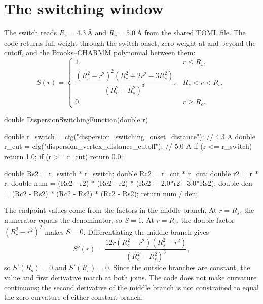 \documentclass[11pt]{article}
\begin{document}
\section{The switching window}

The switch reads
\(R_s=\SI{4.3}{\angstrom}\) and \(R_c=\SI{5.0}{\angstrom}\) from the shared
TOML file. The code returns full weight through the switch onset, zero weight
at and beyond the cutoff, and the Brooks--CHARMM polynomial between them:
\[
S(r)=
\begin{cases}
1, & r\le R_s,\\[3pt]
\dfrac{(R_c^2-r^2)^2(R_c^2+2r^2-3R_s^2)}
      {(R_c^2-R_s^2)^3}, & R_s<r<R_c,\\[9pt]
0, & r\ge R_c .
\end{cases}
\]

\begin{codebox}
double DispersionSwitchingFunction(double r) {
    double r_switch = cfg("dispersion_switching_onset_distance"); // 4.3 A
    double r_cut    = cfg("dispersion_vertex_distance_cutoff");    // 5.0 A
    if (r <= r_switch) return 1.0;
    if (r >= r_cut)    return 0.0;

    double Rs2 = r_switch * r_switch;
    double Rc2 = r_cut * r_cut;
    double r2  = r * r;
    double num = (Rc2 - r2) * (Rc2 - r2) * (Rc2 + 2.0*r2 - 3.0*Rs2);
    double den = (Rc2 - Rs2) * (Rc2 - Rs2) * (Rc2 - Rs2);
    return num / den;
}
\end{codebox}

The endpoint values come from the factors in the middle branch. At
\(r=R_s\), the numerator equals the denominator, so \(S=1\). At \(r=R_c\), the
double factor \((R_c^2-r^2)^2\) makes \(S=0\). Differentiating the middle
branch gives
\[
  S'(r)=
  \frac{12r(R_c^2-r^2)(R_s^2-r^2)}{(R_c^2-R_s^2)^3},
\]
so \(S'(R_s)=0\) and \(S'(R_c)=0\). Since the outside branches are constant,
the value and first derivative match at both joins. The code does not make
curvature continuous; the second derivative of the middle branch is not
constrained to equal the zero curvature of either constant branch.
\end{document}
